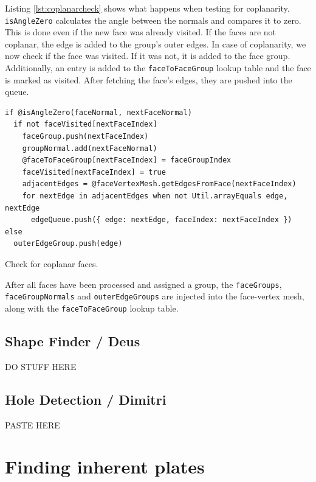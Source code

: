 \documentclass[../ClassicThesis.tex]{subfiles}
\begin{document}
Listing \ref{lst:coplanarcheck} shows what happens when testing for coplanarity. \texttt{isAngleZero} calculates the angle between the normals and compares it to zero. This is done even if the new face was already visited. If the faces are not coplanar, the edge is added to the group's outer edges. In case of coplanarity, we now check if the face was visited. If it was not, it is added to the face group. Additionally, an entry is added to the \texttt{faceToFaceGroup} lookup table and the face is marked as visited. After fetching the face's edges, they are pushed into the queue.

\begin{listing}[ht]
\begin{verbatim}
if @isAngleZero(faceNormal, nextFaceNormal)
  if not faceVisited[nextFaceIndex]
    faceGroup.push(nextFaceIndex)
    groupNormal.add(nextFaceNormal)
    @faceToFaceGroup[nextFaceIndex] = faceGroupIndex
    faceVisited[nextFaceIndex] = true
    adjacentEdges = @faceVertexMesh.getEdgesFromFace(nextFaceIndex)
    for nextEdge in adjacentEdges when not Util.arrayEquals edge, nextEdge
      edgeQueue.push({ edge: nextEdge, faceIndex: nextFaceIndex })
else
  outerEdgeGroup.push(edge)
\end{verbatim}
\caption{Check for coplanar faces.}
\label{lst:coplanarcheck}
\end{listing}

After all faces have been processed and assigned a group, the \texttt{faceGroups}, \texttt{faceGroupNormals} and \texttt{outerEdgeGroups} are injected into the face-vertex mesh, along with the \texttt{faceToFaceGroup} lookup table.

\subsection{Shape Finder / Deus}

DO STUFF HERE

\subsection{Hole Detection / Dimitri}

PASTE HERE

\section{Finding inherent plates}
\end{document}
